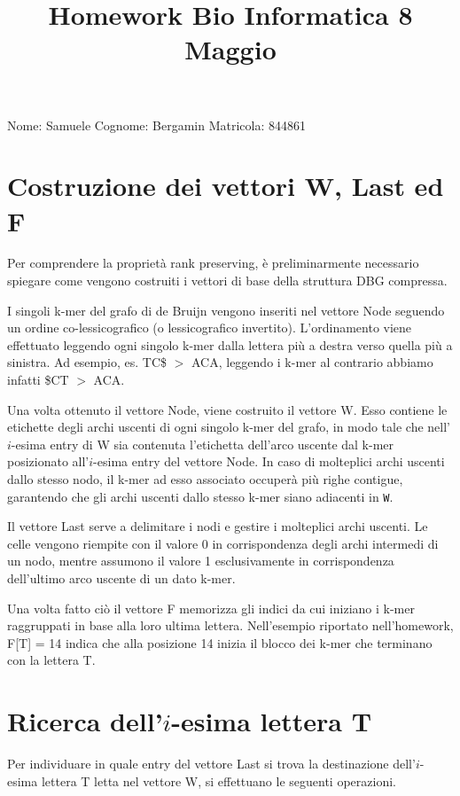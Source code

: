 \documentclass[a4paper,11pt]{article}
\begin{document}
\title{Homework Bio Informatica 8 Maggio}
\date{}
\maketitle


Nome: Samuele
Cognome: Bergamin
Matricola: 844861

\section{Costruzione dei vettori W, Last ed F}
Per comprendere la proprietà rank preserving, è preliminarmente necessario spiegare come vengono costruiti i vettori di base della struttura DBG compressa.

I singoli k-mer del grafo di de Bruijn vengono inseriti nel vettore Node seguendo un ordine co-lessicografico (o lessicografico invertito). L'ordinamento viene effettuato leggendo ogni singolo k-mer dalla lettera più a destra verso quella più a sinistra. Ad esempio, es. TC\$ $>$ ACA, leggendo i k-mer al contrario abbiamo infatti \$CT $>$ ACA.

Una volta ottenuto il vettore Node, viene costruito il vettore W. Esso contiene le etichette degli archi uscenti di ogni singolo k-mer del grafo, in modo tale che nell'$i$-esima entry di W sia contenuta l'etichetta dell'arco uscente dal k-mer posizionato all'$i$-esima entry del vettore Node. In caso di molteplici archi uscenti dallo stesso nodo, il k-mer ad esso associato occuperà più righe contigue, garantendo che gli archi uscenti dallo stesso k-mer siano adiacenti in \texttt{W}.

Il vettore Last serve a delimitare i nodi e gestire i molteplici archi uscenti. Le celle vengono riempite con il valore 0 in corrispondenza degli archi intermedi di un nodo, mentre assumono il valore 1 esclusivamente in corrispondenza dell'ultimo arco uscente di un dato k-mer.

Una volta fatto ciò il vettore F memorizza gli indici da cui iniziano i k-mer raggruppati in base alla loro ultima lettera. Nell'esempio riportato nell'homework, F[T] = 14 indica che alla posizione 14 inizia il blocco dei k-mer che terminano con la lettera T.

\section{Ricerca dell'$i$-esima lettera T }
Per individuare in quale entry del vettore Last si trova la destinazione dell'$i$-esima lettera T letta nel vettore W, si effettuano le seguenti operazioni.
\end{document}
